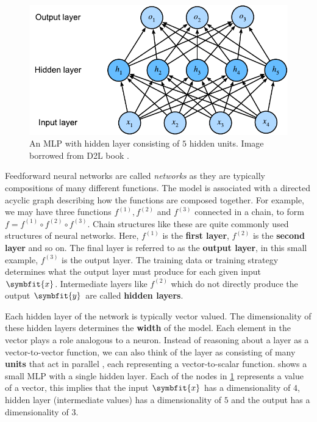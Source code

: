 % 
\begin{figure}
    \centering
    \captionsetup{justification=centering}
    \includegraphics[scale=0.9]{chapters/assets/mlp.pdf}
    \caption{An MLP with hidden layer consisting of $5$ hidden units. Image borrowed from D2L book \parencite{zhang2021dive}.}
    \label{fig:mlp}
\end{figure}

Feedforward neural networks are called \textit{networks} as they are typically compositions of many different functions. The model is associated with a directed acyclic graph describing how the functions are composed together.
For example, we may have three functions \(f^{(1)}, f^{(2)}\) and $f^{(3)}$ connected in a chain, to form \(f = f^{(1)} \circ f^{(2)} \circ f^{(3)}\). 
Chain structures like these are quite commonly used structures of neural networks. Here, $f^{(1)}$ is the \textbf{first layer}, $f^{(2)}$ is the \textbf{second layer} and so on. 
The final layer is referred to as the \textbf{output layer}, in this small example, $f^{(3)}$ is the output layer. The training data or training strategy determines what the output layer must produce for each given input $\symbfit{x}$.
Intermediate layers like $f^{(2)}$ which do not directly produce the output $\symbfit{y}$ are called \textbf{hidden layers}.

Each hidden layer of the network is typically vector valued. The dimensionality of these hidden layers determines the \textbf{width} of the model. Each element in the vector plays a role analogous to a neuron. Instead of reasoning about a layer as a vector-to-vector function, we can also think of the layer as consisting of many \textbf{units} that act in parallel \parencite{Pinker1988}, each representing a vector-to-scalar function. 
 shows a small MLP with a single hidden layer. Each of the nodes in \cref{fig:mlp} represents a value of a vector, this implies that the input $\symbfit{x}$ has a dimensionality of $4$, hidden layer (intermediate values) has a dimensionality of $5$ and the output has a dimensionality of $3$.

